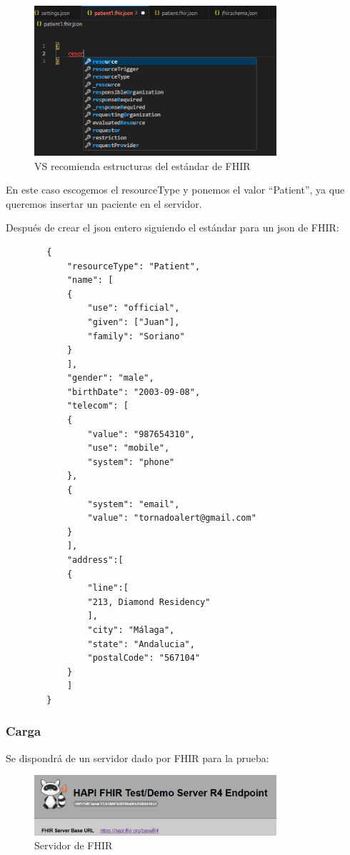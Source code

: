 \documentclass[12pt, a4paper, twoside]{article}
\begin{document}
	\begin{figure}[h!]
		\centering
		\includegraphics[width=0.8\textwidth]{image/4.png}
		\caption{VS recomienda estructuras del estándar de FHIR}
		\label{fig:4}
	\end{figure}
	
	En este caso escogemos el resourceType y ponemos el valor “Patient”, ya que queremos insertar un paciente en el servidor.
	
	Después de crear el json entero siguiendo el estándar para un json de FHIR:
	
	\begin{verbatim}
		{
			"resourceType": "Patient",
			"name": [
			{
				"use": "official",
				"given": ["Juan"],
				"family": "Soriano"
			}
			],
			"gender": "male",
			"birthDate": "2003-09-08",
			"telecom": [
			{
				"value": "987654310",
				"use": "mobile",
				"system": "phone"
			},
			{
				"system": "email",
				"value": "tornadoalert@gmail.com"
			}
			],
			"address":[
			{
				"line":[
				"213, Diamond Residency"
				],
				"city": "Málaga",
				"state": "Andalucia",
				"postalCode": "567104"
			}
			]
		}
	\end{verbatim}
	\cite{HL7Patient}
	
	\subsubsection{Carga}
	
	Se dispondrá de un servidor dado por FHIR para la prueba:
	
	\begin{figure}[h!]
		\centering
		\includegraphics[width=0.8\textwidth]{image/5.png}
		\caption{Servidor de FHIR}
		\label{fig:5}
	\end{figure}
	\vspace{5cm}
	
\end{document}
